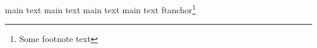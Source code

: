 \documentclass{article}
\begin{document}
main text main text main text
main text ftanchor\footnote{Some footnote text}
\end{document}
